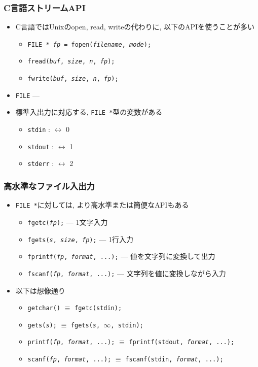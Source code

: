 \documentclass[12pt,dvipdfmx]{beamer}
\begin{document}
\begin{frame}[fragile]
  \frametitle{C言語ストリームAPI}
  \begin{itemize}
  \item C言語ではUnixのopen, read, writeの代わりに,
    以下のAPIを使うことが多い
    \begin{itemize}
    \item {\tt FILE * {\it fp} = fopen({\it filename}, {\it mode});}
    \item {\tt fread({\it buf}, {\it size}, {\it n}, {\it fp});}
    \item {\tt fwrite({\it buf}, {\it size}, {\it n}, {\it fp});}
    \end{itemize}
  \item {\tt FILE} --- 
  \item 標準入出力に対応する, {\tt FILE *}型の変数がある
    \begin{itemize}
    \item {\tt stdin} : $\leftrightarrow$ 0
    \item {\tt stdout} : $\leftrightarrow$ 1
    \item {\tt stderr} : $\leftrightarrow$ 2
    \end{itemize}
  \end{itemize}
\end{frame}

\begin{frame}[fragile]
  \frametitle{高水準なファイル入出力}
  \begin{itemize}
  \item {\tt FILE *}に対しては, より高水準または簡便なAPIもある
    \begin{itemize}
    \item {\tt fgetc({\it fp});} --- 1文字入力
    \item {\tt fgets({\it s}, {\it size}, {\it fp});} --- 1行入力
    \item {\tt fprintf({\it fp}, {\it format}, ...);}
      --- 値を文字列に変換して出力
    \item {\tt fscanf({\it fp}, {\it format}, ...);}
      --- 文字列を値に変換しながら入力
    \end{itemize}
  \item 以下は想像通り
    \begin{itemize}
    \item {\tt getchar()} $\equiv$ {\tt fgetc(stdin);}
    \item {\tt gets({\it s});}
      $\equiv$ {\tt fgets({\it s}, $\infty$, stdin);} 
    \item {\tt printf({\it fp}, {\it format}, ...);}
      $\equiv$ {\tt fprintf(stdout, {\it format}, ...);}
    \item {\tt scanf({\it fp}, {\it format}, ...);}
      $\equiv$ {\tt fscanf(stdin, {\it format}, ...);}
    \end{itemize}
  \end{itemize}
\end{frame}
\end{document}

